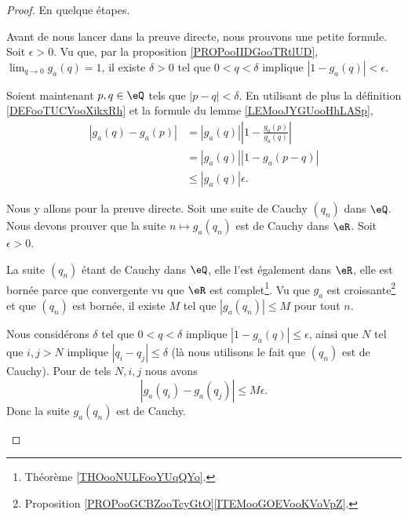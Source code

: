 \begin{proof}
	En quelque étapes.
	\begin{subproof}
		\spitem[Pour \( a>1\)]
		Avant de nous lancer dans la preuve directe, nous prouvons une petite formule. Soit \( \epsilon>0\). Vu que, par la proposition \ref{PROPooIIDGooTRtlUD}, \( \lim_{q\to 0} g_a(q)=1\), il existe \( \delta>0\) tel que \( 0<q<\delta\) implique \( | 1-g_a(q) |<\epsilon\).

		Soient maintenant \( p,q\in \eQ\) tels que \( | p-q |<\delta\). En utilisant de plus la définition \eqref{DEFooTUCVooXikxRh} et la formule du lemme \ref{LEMooJYGUooHhLASp},
		\begin{subequations}
			\begin{align}
				| g_a(q)-g_a(p) |&=| g_a(q) |\left| 1-\frac{ g_a(p) }{ g_a(q) } \right|\\
                &=| g_a(q) | | 1-g_a(p-q) |\\
                &\leq | g_a(q) |\epsilon.
			\end{align}
		\end{subequations}

		Nous y allons pour la preuve directe. Soit une suite de Cauchy \( (q_n)\) dans \( \eQ\). Nous devons prouver que la suite \( n\mapsto g_a(q_n)\) est de Cauchy dans \( \eR\). Soit \( \epsilon>0\).

		La suite \((q_n)\) étant de Cauchy dans \( \eQ\), elle l'est également dans \( \eR\), elle est bornée parce que convergente vu que \( \eR\) est complet\footnote{Théorème \ref{THOooNULFooYUqQYo}.}. Vu que \( g_a\) est croissante\footnote{Proposition \ref{PROPooGCBZooTcyGtO}\ref{ITEMooGOEVooKVoVpZ}.} et que \( (q_n)\) est bornée, il existe \( M\) tel que \( | g_a(q_n) |\leq M\) pour tout \( n\).

		Nous considérons \( \delta\) tel que \( 0<q<\delta\) implique \( | 1-g_a(q) |\leq \epsilon\), ainsi que \( N\) tel que \( i,j>N\) implique \( | q_i-q_j |\leq \delta\) (là nous utilisons le fait que \( (q_n)\) est de Cauchy). Pour de tels \( N, i,j\) nous avons
		\begin{equation}
			| g_a(q_i)-g_a(q_j) |\leq M\epsilon.
		\end{equation}
		Donc la suite \( g_a(q_n)\) est de Cauchy.


\end{subproof}
\end{proof}
